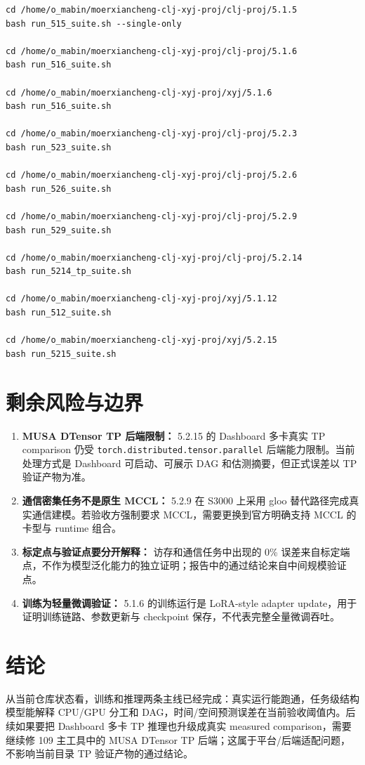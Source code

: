 \documentclass[UTF8,a4paper,11pt]{ctexart}
\begin{document}
\begin{verbatim}
cd /home/o_mabin/moerxiancheng-clj-xyj-proj/clj-proj/5.1.5
bash run_515_suite.sh --single-only

cd /home/o_mabin/moerxiancheng-clj-xyj-proj/clj-proj/5.1.6
bash run_516_suite.sh

cd /home/o_mabin/moerxiancheng-clj-xyj-proj/xyj/5.1.6
bash run_516_suite.sh

cd /home/o_mabin/moerxiancheng-clj-xyj-proj/clj-proj/5.2.3
bash run_523_suite.sh

cd /home/o_mabin/moerxiancheng-clj-xyj-proj/clj-proj/5.2.6
bash run_526_suite.sh

cd /home/o_mabin/moerxiancheng-clj-xyj-proj/clj-proj/5.2.9
bash run_529_suite.sh

cd /home/o_mabin/moerxiancheng-clj-xyj-proj/clj-proj/5.2.14
bash run_5214_tp_suite.sh

cd /home/o_mabin/moerxiancheng-clj-xyj-proj/xyj/5.1.12
bash run_512_suite.sh

cd /home/o_mabin/moerxiancheng-clj-xyj-proj/xyj/5.2.15
bash run_5215_suite.sh
\end{verbatim}

\section{剩余风险与边界}

\begin{enumerate}
  \item \textbf{MUSA DTensor TP 后端限制：} 5.2.15 的 Dashboard 多卡真实 TP comparison 仍受 \texttt{torch.distributed.tensor.parallel} 后端能力限制。当前处理方式是 Dashboard 可启动、可展示 DAG 和估测摘要，但正式误差以 TP 验证产物为准。
  \item \textbf{通信密集任务不是原生 MCCL：} 5.2.9 在 S3000 上采用 gloo 替代路径完成真实通信建模。若验收方强制要求 MCCL，需要更换到官方明确支持 MCCL 的卡型与 runtime 组合。
  \item \textbf{标定点与验证点要分开解释：} 访存和通信任务中出现的 0\% 误差来自标定端点，不作为模型泛化能力的独立证明；报告中的通过结论来自中间规模验证点。
  \item \textbf{训练为轻量微调验证：} 5.1.6 的训练运行是 LoRA-style adapter update，用于证明训练链路、参数更新与 checkpoint 保存，不代表完整全量微调吞吐。
\end{enumerate}

\section{结论}

从当前仓库状态看，训练和推理两条主线已经完成：真实运行能跑通，任务级结构模型能解释 CPU/GPU 分工和 DAG，时间/空间预测误差在当前验收阈值内。后续如果要把 Dashboard 多卡 TP 推理也升级成真实 measured comparison，需要继续修 109 主工具中的 MUSA DTensor TP 后端；这属于平台/后端适配问题，不影响当前目录 TP 验证产物的通过结论。
\end{document}
